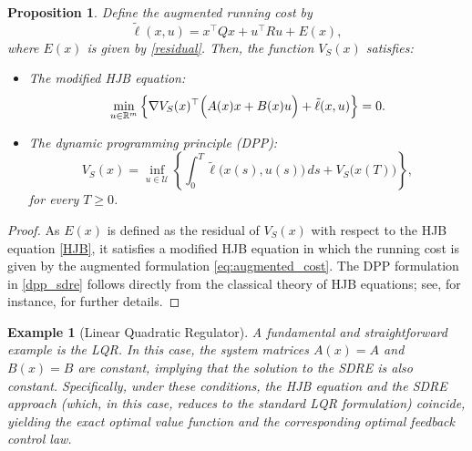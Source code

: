\documentclass{article}
\newtheorem{proposition}{Proposition}[section]
\newtheorem{example}{Example}[section]
\begin{document}



\begin{proposition}
Define the augmented running cost by
\begin{equation}\label{eq:augmented_cost}
\tilde{\ell}(x,u) = x^\top Q x + u^\top R u + E(x),
\end{equation}
where $E(x)$ is given by \eqref{residual}.
Then, the function $V_S(x)$
satisfies:
\begin{itemize}
    \item The modified HJB equation:
    \begin{equation}
    \min_{u\in \mathbb{R}^m} \left\{ \nabla V_S(x)^\top\Bigl(A(x)x+B(x)u\Bigr) + \tilde{\ell}(x,u) \right\} = 0.
    \label{hjb_sdre}
        \end{equation}
    \item The dynamic programming principle (DPP):
       \begin{equation}
    V_S(x) = \inf_{u \in \mathcal{U}} \left\{ \int_0^T \tilde{\ell}\bigl(x(s),u(s)\bigr)\,ds + V_S\bigl(x(T)\bigr) \right\},
        \label{dpp_sdre}
        \end{equation}
    for every \(T\ge 0\).
\end{itemize}
\end{proposition}

\begin{proof}
As $E(x)$ is defined as the residual of $V_S(x)$ with respect to the HJB equation \eqref{HJB}, it satisfies a modified HJB equation in which the running cost is given by the augmented formulation \eqref{eq:augmented_cost}. The DPP formulation in \eqref{dpp_sdre} follows directly from the classical theory of HJB equations; see, for instance, \cite{BCD97} for further details.
 
\end{proof}

\begin{example}[Linear Quadratic Regulator]
A fundamental and straightforward example is the LQR. In this case, the system matrices $A(x)=A$ and $B(x)=B$ are constant, implying that the solution to the SDRE is also constant. Specifically, under these conditions, the HJB equation and the SDRE approach (which, in this case, reduces to the standard LQR formulation) coincide, yielding the exact optimal value function and the corresponding optimal feedback control law.
    
\end{example}
\end{document}
